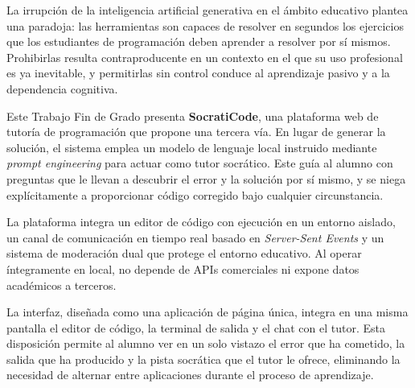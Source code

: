 La irrupción de la inteligencia artificial generativa en el ámbito educativo plantea una paradoja: las herramientas son capaces de resolver en segundos los ejercicios que los estudiantes de programación deben aprender a resolver por sí mismos. Prohibirlas resulta contraproducente en un contexto en el que su uso profesional es ya inevitable, y permitirlas sin control conduce al aprendizaje pasivo y a la dependencia cognitiva.

Este Trabajo Fin de Grado presenta \textbf{SocratiCode}, una plataforma web de tutoría de programación que propone una tercera vía. En lugar de generar la solución, el sistema emplea un modelo de lenguaje local instruido mediante \textit{prompt engineering} para actuar como tutor socrático. Este guía al alumno con preguntas que le llevan a descubrir el error y la solución por sí mismo, y se niega explícitamente a proporcionar código corregido bajo cualquier circunstancia.

La plataforma integra un editor de código con ejecución en un entorno aislado, un canal de comunicación en tiempo real basado en \textit{Server-Sent Events} y un sistema de moderación dual que protege el entorno educativo. Al operar íntegramente en local, no depende de APIs comerciales ni expone datos académicos a terceros.

La interfaz, diseñada como una aplicación de página única, integra en una misma pantalla el editor de código, la terminal de salida y el chat con el tutor. Esta disposición permite al alumno ver en un solo vistazo el error que ha cometido, la salida que ha producido y la pista socrática que el tutor le ofrece, eliminando la necesidad de alternar entre aplicaciones durante el proceso de aprendizaje.

